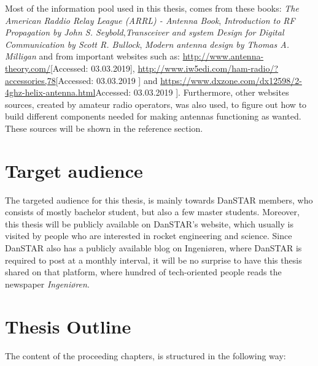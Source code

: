 Most of the information pool used in this thesis, comes from these books: \textit{The American Raddio Relay League (ARRL) - Antenna Book}\cite{ARRL}, \textit{Introduction to RF Propagation by John S. Seybold}\cite{RFpropagation},\textit{Transceiver and system Design for Digital Communication by Scott R. Bullock}\cite{TransceiverBook}, \textit{Modern antenna design by Thomas A. Milligan}\cite{modernantenna} and from important websites such as: \url{http://www.antenna-theory.com/}[Accessed: 03.03.2019], \url{http://www.iw5edi.com/ham-radio/?accessories,78}[Accessed: 03.03.2019 ] and \url{	https://www.dxzone.com/dx12598/2-4ghz-helix-antenna.html}Accessed: 03.03.2019 ]. Furthermore, other websites sources, created by amateur radio operators, was also used, to figure out how to build different components needed for making  antennas functioning as wanted. These sources will be shown in the reference section.



\section{Target audience}
The targeted audience for this thesis, is mainly towards DanSTAR members, who consists of mostly bachelor student, but also a few master students. Moreover, this thesis will be publicly available on DanSTAR's website\cite{DanSTAR}, which usually is visited by people who are interested in rocket engineering and science. Since DanSTAR also has a publicly available blog\cite{DanSTARblog} on Ingeniøren\cite{Ingenioeren}, where DanSTAR is required to post at a monthly interval, it will be no surprise to have this thesis shared on that platform, where hundred of tech-oriented people reads the newspaper \textit{Ingeniøren}.    

\section{Thesis Outline}
The content of the proceeding chapters, is structured in the following way:

